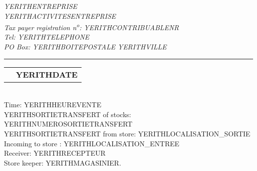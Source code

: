 \documentclass[2pt]{article} %
\makeatletter
\newcommand{\headerrow}[2]
{\begin{tabular*}{\linewidth}{l@{\extracolsep{\fill}}r}
	#1 &
	#2 \\
\end{tabular*}}
\makeatother
\begin{document}
\emph{YERITHENTREPRISE} \\
\emph{YERITHACTIVITESENTREPRISE} \\
\emph{Tax payer registration n\textsuperscript{o}: YERITHCONTRIBUABLENR} \\
\emph{Tel: YERITHTELEPHONE} \\
\emph{PO Box: YERITHBOITEPOSTALE YERITHVILLE}

\vspace*{0.2cm}

\hrule

\headerrow
{}
{\textbf{YERITHDATE}}\\

Time: YERITHHEUREVENTE\\
YERITHSORTIETRANSFERT of stocks: YERITHNUMEROSORTIETRANSFERT\\
YERITHSORTIETRANSFERT from store: YERITHLOCALISATION_SORTIE\\
Incoming to store : YERITHLOCALISATION_ENTREE\\
Receiver: YERITHRECEPTEUR\\
Store keeper: YERITHMAGASINIER.

\vspace*{0.2cm}

\end{document}
